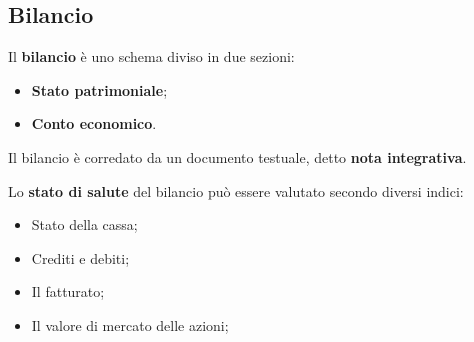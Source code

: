 \documentclass[a4paper,11pt]{article}
\begin{document}
\subsection{Bilancio}
Il \textbf{bilancio} è uno schema diviso in due sezioni:
\begin{itemize}
	\item \textbf{Stato patrimoniale};
	\item \textbf{Conto economico}.
\end{itemize}
Il bilancio è corredato da un documento testuale, detto \textbf{nota integrativa}.

Lo \textbf{stato di salute} del bilancio può essere valutato secondo diversi indici:
\begin{itemize}
	\item Stato della cassa;
	\item Crediti e debiti;
	\item Il fatturato;
	\item Il valore di mercato delle azioni; 
\end{itemize}
\end{document}

